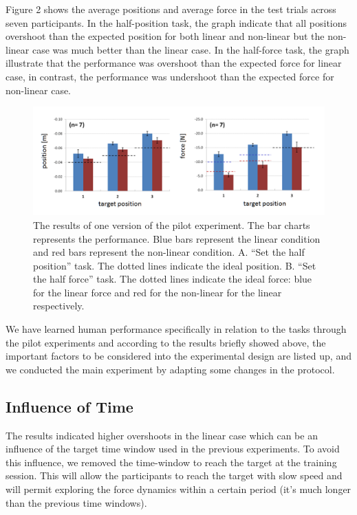 Figure 2 shows the average positions and average force in the test trials across seven participants. In the half-position task, the graph indicate that all positions overshoot than the expected position for both linear and non-linear but the non-linear case was much better than the linear case. In the half-force task, the graph illustrate that the performance was overshoot than the expected force for linear case, in contrast, the performance was undershoot than the expected force for non-linear case.
\begin{figure}
  \centering
  \includegraphics[scale=0.4]{Chie/figs/Figure2.png}
  \caption{The results of one version of the pilot experiment. The bar charts represents the performance. Blue bars represent the linear condition and red bars represent the non-linear condition. A. “Set the half position” task. The dotted lines indicate the ideal position. B. “Set the half force” task. The dotted lines indicate the ideal force: blue for the linear force and red for the non-linear for the linear respectively.}
  \label{pilot}
\end{figure}
We have learned human performance specifically in relation to the tasks through the pilot experiments and according to the results briefly showed above, the important factors to be considered into the experimental design are listed up, and we conducted the main experiment by adapting some changes in the protocol. 

\subsection{Influence of Time} 
The results indicated higher overshoots in the linear case which can be an influence of the target time window used in the previous experiments. To avoid this influence, we removed the time-window to reach the target at the training session. This will allow the participants to reach the target with slow speed and will permit exploring the force dynamics within a certain period (it’s much longer than the previous time windows).

